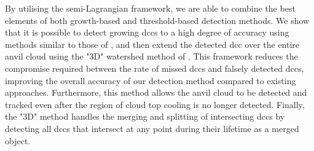 By utilising the semi-Lagrangian framework, we are able to combine the best elements of both growth-based and threshold-based detection methods.
We show that it is possible to detect growing \acrshort{dcc}s to a high degree of accuracy using methods similar to those of \citet{zinner_cb-tram:_2008}, and then extend the detected \acrshort{dcc} over the entire anvil cloud using the "3D" watershed method of \citet{fiolleau_algorithm_2013}.
This framework reduces the compromise required between the rate of missed \acrshort{dcc}s and falsely detected \acrshort{dcc}s, improving the overall accuracy of our detection method compared to existing approaches.
Furthermore, this method allows the anvil cloud to be detected and tracked even after the region of cloud top cooling is no longer detected.
Finally, the "3D" method handles the merging and splitting of intersecting \acrshort{dcc}s by detecting all \acrshort{dcc}s that intersect at any point during their lifetime as a merged object.






